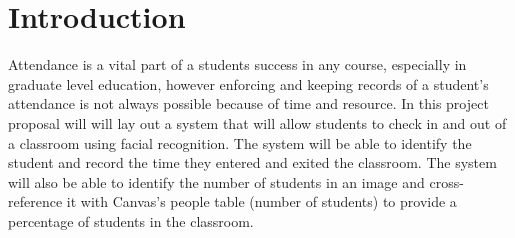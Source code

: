 \section{Introduction}
\label{sec:intro}

Attendance is a vital part of a students success in any course, especially in graduate level education, however enforcing and keeping records of a student's attendance is not always possible because of time and resource. In this project proposal will will lay out a system that will allow students to check in and out of a classroom using facial recognition. The system will be able to identify the student and record the time they entered and exited the classroom. The system will also be able to identify the number of students in an image and cross{-}reference it with Canvas's people table (number of students) to provide a  percentage of students in the classroom. 
